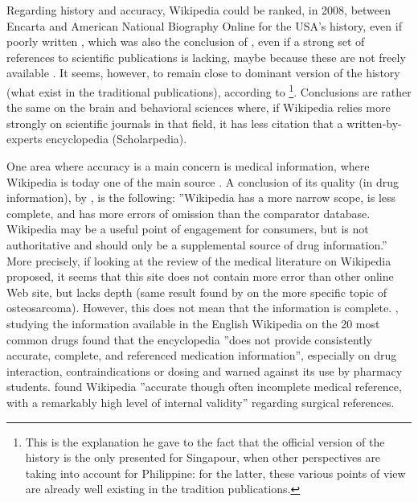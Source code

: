 Regarding history and accuracy, Wikipedia could be ranked, in 2008,
between Encarta and American National Biography Online for the USA's
history, even if poorly written \citep{Rosenzweig06}, which was also
the conclusion of \citet{Rector08}, even if a strong set of references
to scientific publications is lacking, maybe because these are not
freely available \citep{LuytTan10}. It seems, however, to remain
close to dominant version of the history (what exist in the traditional
publications), according to \citet{Luyt11}\footnote{This is the explanation he gave to the fact that the official version
of the history is the only presented for Singapour, when other perspectives
are taking into account for Philippine: for the latter, these various
points of view are already well existing in the tradition publications.}. Conclusions are rather the same on the brain and behavioral sciences
\citep[2010b]{StankusSpiegel10a}\nocite{StankusSpiegel10b} where,
if Wikipedia relies more strongly on scientific journals in that field,
it has less citation that a written-by-experts encyclopedia (Scholarpedia). 

One area where accuracy is a main concern is medical information,
where Wikipedia is today one of the main source \citep{LaurentVickers09}.
A conclusion of its quality (in drug information), by \citet{Clausonetal08},
is the following: ''Wikipedia has a more narrow scope, is less complete,
and has more errors of omission than the comparator database. Wikipedia
may be a useful point of engagement for consumers, but is not authoritative
and should only be a supplemental source of drug information.'' More
precisely, if looking at the review of the medical literature on Wikipedia
\citet{KupferbergProtus11} proposed, it seems that this site does
not contain more error than other online Web site, but lacks depth
(same result found by \citet{Leithneretal10} on the more specific
topic of osteosarcoma). However, this does not mean that the information
is complete. \citet{Lavsaetal11}, studying the information available
in the English Wikipedia on the 20 most common drugs found that the
encyclopedia ''does not provide consistently accurate, complete,
and referenced medication information'', especially on drug interaction,
contraindications or dosing and warned against its use by pharmacy
students. \citet{Devganetal07} found Wikipedia ''accurate though
often incomplete medical reference, with a remarkably high level of
internal validity'' regarding surgical references.